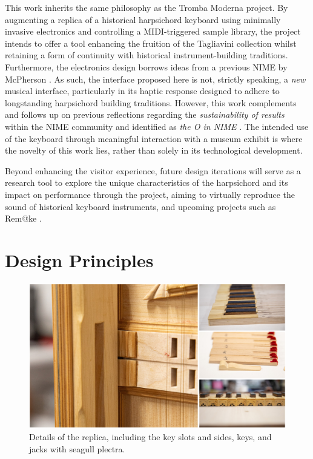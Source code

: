 This work inherits the same philosophy as the Tromba Moderna project. By augmenting a replica of a historical harpsichord keyboard using minimally invasive electronics and controlling a MIDI-triggered sample library, the project intends to offer a tool enhancing the fruition of the Tagliavini collection whilst retaining a form of continuity with historical instrument-building traditions. Furthermore, the electronics design borrows ideas from a previous NIME by McPherson \cite{McPherson2013}. As such, the interface proposed here is not, strictly speaking, a \emph{new} musical interface, particularly in its haptic response designed to adhere to longstanding harpsichord building traditions. However, this work complements and follows up on previous reflections regarding the \emph{sustainability of results} within the NIME community and identified as \emph{the O in NIME} \cite{Masu_NIME_2023}. The intended use of the keyboard through meaningful interaction with a museum exhibit is where the novelty of this work lies, rather than solely in its technological development. 

Beyond enhancing the visitor experience, future design iterations will serve as a research tool to explore the unique characteristics of the harpsichord and its impact on performance through the  project, aiming to virtually reproduce the sound of historical keyboard instruments, and upcoming projects such as Rem@ke \cite{remake1}.

\section{Design Principles}\label{design}

\begin{figure}
\includegraphics[width=\linewidth]{src/images/details.jpg}
\caption{Details of the replica, including the key slots and sides, keys, and jacks with seagull plectra.}\label{fig:details}
\end{figure}

